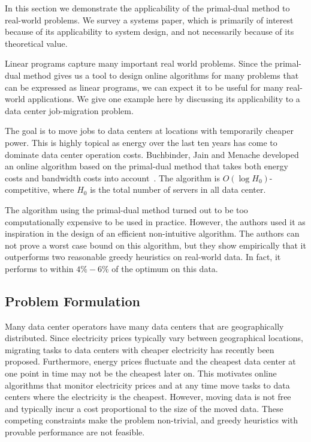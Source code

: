 In this section we demonstrate the applicability of the primal-dual method to real-world problems.
We survey a systems paper, which is primarily of interest because of its applicability to system design, and not necessarily because of its theoretical value.

Linear programs capture many important real world problems. 
Since the primal-dual method gives us a tool to design online algorithms for many problems that can be expressed as linear programs, we can expect it to be useful for many real-world applications.
We give one example here by discussing its applicability to a data center job-migration problem.

The goal is to move jobs to data centers at locations with temporarily cheaper power.
This is highly topical as energy over the last ten years has come to dominate data center operation costs.
Buchbinder, Jain and Menache developed an online algorithm based on the primal-dual method that takes both energy costs and bandwidth costs into account~\cite{buchbinder11:job-migration,buchbinder11:job-migration-techreport}.
The algorithm is $O(\log H_0)$-competitive, where $H_0$ is the total number of servers in all data center.

The algorithm using the primal-dual method turned out to be too computationally expensive to be used in practice.
However, the authors used it as inspiration in the design of an efficient non-intuitive algorithm.
The authors can not prove a worst case bound on this algorithm, but they show empirically that it outperforms two reasonable greedy heuristics on real-world data.
In fact, it performs to within $4\%-6\%$ of the optimum on this data.

\subsection{Problem Formulation}

Many data center operators have many data centers that are geographically distributed.
Since electricity prices typically vary between geographical locations, migrating tasks to data centers with cheaper electricity has recently been proposed.
Furthermore, energy prices fluctuate and the cheapest data center at one point in time may not be the cheapest later on.
This motivates online algorithms that monitor electricity prices and at any time move tasks to data centers where the electricity is the cheapest.
However, moving data is not free and typically incur a cost proportional to the size of the moved data.
These competing constraints make the problem non-trivial, and greedy heuristics with provable performance are not feasible.

